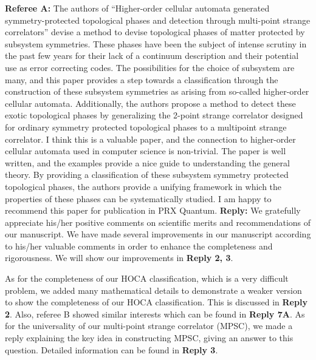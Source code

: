 \documentclass{article}
\begin{document}
\begin{tcolorbox}[title= Reply 1 (general reply), breakable, colframe=blue]
    \textbf{Referee A:} The authors of ``Higher-order cellular automata generated
symmetry-protected topological phases and detection through
multi-point strange correlators'' devise a method to devise topological
phases of matter protected by subsystem symmetries. These phases have
been the subject of intense scrutiny in the past few years for their
lack of a continuum description and their potential use as error
correcting codes. The possibilities for the choice of subsystem are
many, and this paper provides a step towards a classification through
the construction of these subsystem symmetries as arising from
so-called higher-order cellular automata. Additionally, the authors
propose a method to detect these exotic topological phases by
generalizing the 2-point strange correlator designed for ordinary
symmetry protected topological phases to a multipoint strange
correlator. I think this is a {\color{red}valuable paper, and the connection to higher-order
cellular automata used in computer science is non-trivial.} The paper
is well written, and the examples provide a nice guide to
understanding the general theory. By providing a classification of
these subsystem symmetry protected topological phases, the authors
{\color{red} provide a unifying framework in which the properties of these phases
can be systematically studied.} I am happy to recommend this paper for
publication in PRX Quantum.
\tcblower
\textbf{Reply:} We gratefully appreciate his/her positive comments on scientific merits and recommendations of our manuscript. We have made several improvements in our manuscript according to his/her valuable comments in order to enhance the completeness and rigorousness. We will show our improvements in \textbf{Reply 2, 3}.
\begin{outline}[itemize]
    \1 As for the completeness of our HOCA classification, which is a very difficult problem, we added many mathematical details to demonstrate a weaker version to show the completeness of our HOCA classification. This is discussed in \textbf{Reply 2}. Also, referee B showed similar interests which can be found in \textbf{Reply 7A}.
    \1 As for the universality of our multi-point strange correlator (MPSC), we made a reply explaining the key idea in constructing MPSC, giving an answer to this question. Detailed information can be found in \textbf{Reply 3}. 
\end{outline}
\end{tcolorbox}
\end{document}
